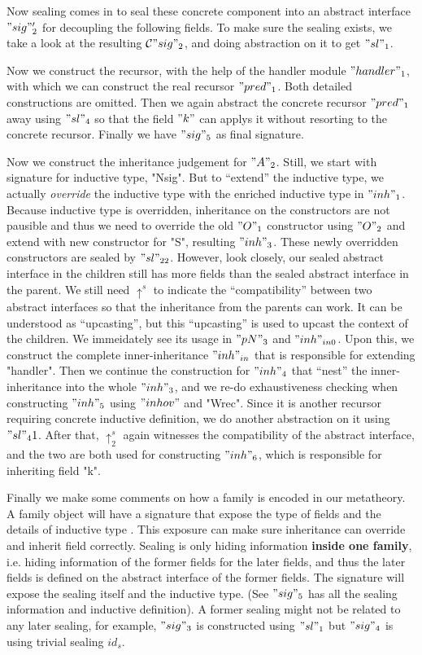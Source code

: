 Now sealing comes in to seal these concrete component into an abstract interface $"sig"_2'$ for decoupling the following fields. To make sure the sealing exists, we take a look at the resulting ${\mathcal{C}} "sig"_2$, and doing abstraction on it to get $"sl"_1$. 

Now we construct the recursor, with the help of the handler module $"handler"_1$, with which we can construct the real recursor $"pred"_1$. Both detailed constructions are omitted. Then we again abstract the concrete recursor $"pred"_1$ away using $"sl"_4$ so that the field $"k"$ can applys it without resorting to the concrete recursor. Finally we have $"sig"_5$ as final signature. 

Now we construct the inheritance judgement for $"A"_2$. Still, we start with signature for inductive type, "Nsig". But to ``extend'' the inductive type, we actually \textit{override} the inductive type with the enriched inductive type in $"inh"_1$. Because inductive type is overridden, inheritance on the constructors are not pausible and thus we need to override the old $"O"_1$ constructor using $"O"_2$ and extend with new constructor for "S", resulting $"inh"_3$. These newly overridden constructors are sealed by $"sl"_{22}$. However, look closely, our sealed abstract interface in the children still has more fields than the sealed abstract interface in the parent. We still need $\uparrow^s$ to indicate the ``compatibility'' between two abstract interfaces so that the inheritance from the parents can work. It can be understood as ``upcasting'', but this ``upcasting'' is used to upcast the context of the children. We immeidately see its usage in $"pN"_3$ and $"inh"_{in0}$. Upon this, we construct the complete inner-inheritance $"inh"_{in}$ that is responsible for extending "handler". Then we continue the construction for $"inh"_4$ that ``nest'' the inner-inheritance into the whole $"inh"_3$, and we re-do exhaustiveness checking when constructing $"inh"_5$ using $"inhov"$ and "Wrec". Since it is another recursor requiring concrete inductive definition, we do another abstraction on it using $"sl"_41$. After that, $\uparrow^s_2$ again witnesses the compatibility of the abstract interface, and the two are both used for constructing $"inh"_6$, which is responsible for inheriting field "k". 

Finally we make some comments on how a family is encoded in our metatheory. A family object will have a signature that expose the type of fields and the details of inductive type . This exposure can make sure inheritance can override and inherit field correctly. Sealing is only hiding information \textbf{inside one family}, i.e. hiding information of the former fields for the later fields, and thus the later fields is defined on the abstract interface of the former fields. The signature will expose the sealing itself and the inductive type. (See $"sig"_5$ has all the sealing information and inductive definition). A former sealing might not be related to any later sealing, for example, $"sig"_3$ is constructed using $"sl"_1$ but $"sig"_4$ is using trivial sealing $id_s$.